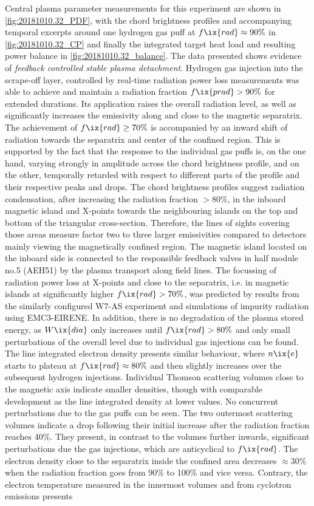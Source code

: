             Central plasma parameter measurements for this experiment are shown in \cref{fig:20181010.32_PDF}, with the chord brightness profiles and accompanying temporal excerpts around one hydrogen gas puff at $f\ix{rad}\approx90\%$ in \cref{fig:20181010.32_CP} and finally the integrated target heat load and resulting power balance in \cref{fig:20181010.32_balance}. The data presented shows evidence of \textit{feedback controlled stable plasma detachment}. Hydrogen gas injection into the scrape-off layer, controlled by real-time radiation power loss measurements was able to achieve and maintain a radiation fraction $f\ix{prad}>90\%$ for extended durations. Its application raises the overall radiation level, as well as significantly increases the emissivity along and close to the magnetic separatrix. The achievement of $f\ix{rad}\ge70\%$ is accompanied by an inward shift of radiation towards the separatrix and center of the confined region. This is supported by the fact that the response to the individual gas puffs is, on the one hand, varying strongly in amplitude across the chord brightness profile, and on the other, temporally retarded with respect to different parts of the profile and their respective peaks and drops. The chord brightness profiles suggest radiation condensation, after increasing the radiation fraction $>80\%$, in the inboard magnetic island and X-points towards the neighbouring islands on the top and bottom of the triangular cross-section. Therefore, the lines of sights covering those areas measure factor two to three larger emissivities compared to detectors mainly viewing the magnetically confined region. The magnetic island located on the inboard side is connected to the responsible feedback valves in half module no.5 (AEH51) by the plasma transport along field lines. The focussing of radiation power loss at X-points and close to the separatrix, i.e. in magnetic islands at significantly higher $f\ix{rad}>70\%$, was predicted by results from the similarly configured W7-AS experiment and simulations of impurity radiation using EMC3-EIRENE\cite{Feng2005,Thomsen2004,Feng2016}. In addition, there is no degradation of the plasma stored energy, as $W\ix{dia}$ only increases until $f\ix{rad}>80\%$ and only small perturbations of the overall level due to individual gas injections can be found. The line integrated electron density presents similar behaviour, where $n\ix{e}$ starts to plateau at $f\ix{rad}\approx80\%$ and then slightly increases over the subsequent hydrogen injections. Individual Thomson scattering volumes close to the magnetic axis indicate smaller densities, though with comparable development as the line integrated density at lower values. No concurrent perturbations due to the gas puffs can be seen. The two outermost scattering volumes indicate a drop following their initial increase after the radiation fraction reaches 40\%. They present, in contrast to the volumes further inwards, significant perturbations due the gas injections, which are anticyclical to $f\ix{rad}$. The electron density close to the separatrix inside the confined area decreases $\approx30\%$ when the radiation fraction goes from 90\% to 100\% and vice versa. Contrary, the electron temperature measured in the innermost volumes and from cyclotron emissions presents 